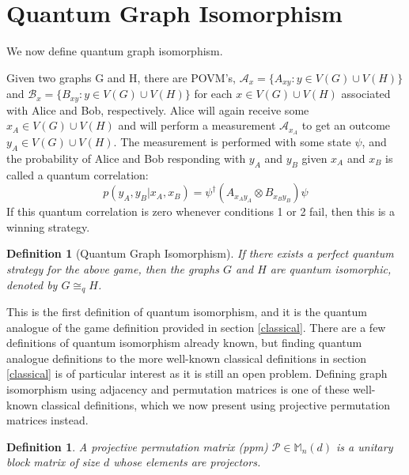 \documentclass[12pt]{article}
\newtheorem{defn}[thm]{Definition}
\begin{document}
\section{Quantum Graph Isomorphism}
We now define quantum graph isomorphism. 

Given two graphs G and H, there are POVM's, $\mathcal{A}_x = \{A_{xy}: y \in V(G) \cup V(H)\}$ and $\mathcal{B}_x = \{B_{xy}: y \in V(G) \cup V(H)\}$ for each $x \in V(G) \cup V(H)$ associated with Alice and Bob, respectively.
Alice will again receive some $x_A \in V(G) \cup V(H)$ and will perform a measurement $\mathcal{A}_{x_A}$ to get an outcome $y_A \in V(G) \cup V(H)$.
The measurement is performed with some state $\psi$, and the probability of Alice and Bob responding with $y_A$ and $y_B$ given $x_A$ and $x_B$ is called a quantum correlation: 
\begin{equation}
p(y_A, y_B|x_A, x_B) = \psi^\dag(A_{x_Ay_A}\otimes B_{x_By_B})\psi
\end{equation}
If this quantum correlation is zero whenever conditions 1 or 2 fail, then this is a winning strategy.

\begin{defn}[Quantum Graph Isomorphism]
\label{qgame}
If there exists a perfect quantum strategy for the above game, then the graphs $G$ and $H$ are quantum isomorphic, denoted by $G \cong_q H$.
\end{defn}

This is the first definition of quantum isomorphism, and it is the quantum analogue of the game definition provided in section \ref{classical}. There are a few definitions of quantum isomorphism already known, but finding quantum analogue definitions to the more well-known classical definitions in section \ref{classical} is of particular interest as it is still an open problem. Defining graph isomorphism using adjacency and permutation matrices is one of these well-known classical definitions, which we now present using projective permutation matrices instead.

\begin{defn}
A projective permutation matrix (ppm) $\mathcal{P} \in \mathbb{M}_n(d)$ is a unitary block matrix of size $d$ whose elements are projectors.
\end{defn}
\end{document}

